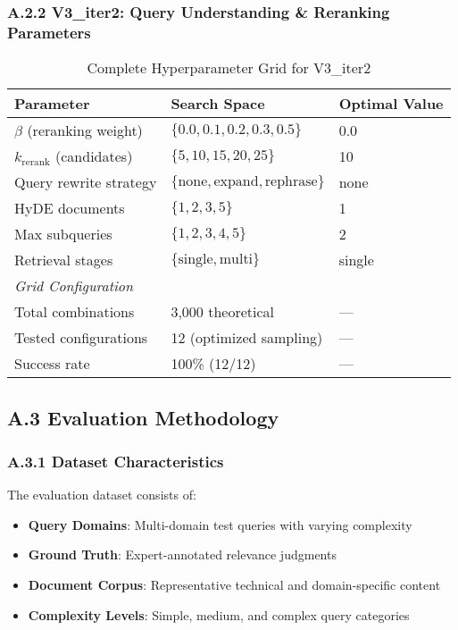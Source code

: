 \documentclass{article}
\begin{document}
\subsubsection{A.2.2 V3\_iter2: Query Understanding \& Reranking Parameters}
\begin{table}[h]
\centering
\caption{Complete Hyperparameter Grid for V3\_iter2}
\begin{tabular}{@{}lll@{}}
\toprule
\textbf{Parameter} & \textbf{Search Space} & \textbf{Optimal Value} \\
\midrule
$\beta$ (reranking weight) & $\{0.0, 0.1, 0.2, 0.3, 0.5\}$ & 0.0 \\
$k_{\text{rerank}}$ (candidates) & $\{5, 10, 15, 20, 25\}$ & 10 \\
Query rewrite strategy & $\{\text{none}, \text{expand}, \text{rephrase}\}$ & none \\
HyDE documents & $\{1, 2, 3, 5\}$ & 1 \\
Max subqueries & $\{1, 2, 3, 4, 5\}$ & 2 \\
Retrieval stages & $\{\text{single}, \text{multi}\}$ & single \\
\midrule
\multicolumn{3}{l}{\textit{Grid Configuration}} \\
Total combinations & 3,000 theoretical & --- \\
Tested configurations & 12 (optimized sampling) & --- \\
Success rate & 100\% (12/12) & --- \\
\bottomrule
\end{tabular}
\end{table}

\subsection{A.3 Evaluation Methodology}

\subsubsection{A.3.1 Dataset Characteristics}
The evaluation dataset consists of:
\begin{itemize}
\item \textbf{Query Domains}: Multi-domain test queries with varying complexity
\item \textbf{Ground Truth}: Expert-annotated relevance judgments
\item \textbf{Document Corpus}: Representative technical and domain-specific content
\item \textbf{Complexity Levels}: Simple, medium, and complex query categories
\end{itemize}
\end{document}
